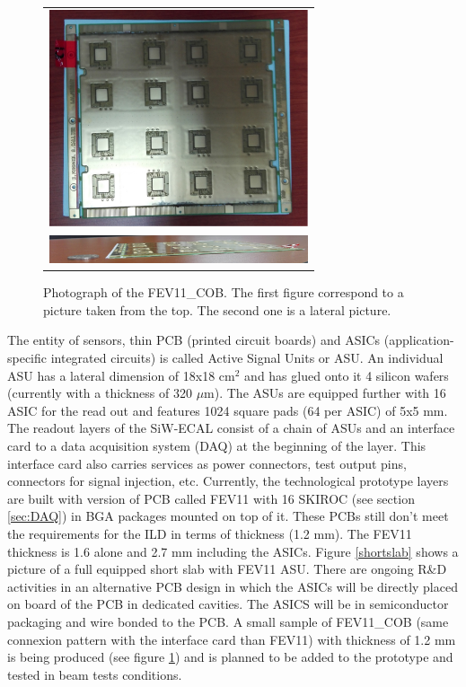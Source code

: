 \documentclass[journal]{IEEEtran}
\begin{document}
\begin{figure}[!t]
  \centering
  \begin{tabular}{l}
    \includegraphics[width=3.0in]{fevcob1-eps-converted-to.pdf}\\
    \includegraphics[width=3.0in]{fevcob2-eps-converted-to.pdf}
  \end{tabular}
\caption{Photograph of the FEV11\_COB. The first figure correspond to a picture taken from the top. The second one is a lateral picture.}
\label{fevcob}
\end{figure}

The entity
of sensors, thin PCB (printed circuit boards) and ASICs (application-specific integrated circuits) is called Active Signal Units or ASU.
An individual ASU has a lateral dimension of 18x18 cm$^{2}$ and has glued onto it 4 silicon wafers (currently with a thickness of 320 $\mu$m).
The ASUs are equipped
further with 16 ASIC for the read out and features 1024 square pads (64 per ASIC) of 5x5 mm.
The readout layers of the SiW-ECAL consist of a chain of ASUs and an interface card
to a data acquisition system (DAQ) at the beginning of the layer.
This interface card also carries services as power connectors,
test output pins, connectors for signal injection, etc. 
Currently, the technological prototype layers are built with version of PCB called FEV11 with 16 SKIROC (see section \ref{sec:DAQ})
 in BGA packages mounted on top of it.
These PCBs still don't meet the requirements
for the ILD in terms of thickness (1.2 mm). The FEV11 thickness is 1.6 alone and 2.7 mm including the ASICs.
Figure \ref{shortslab} shows a picture of a full equipped short slab with FEV11 ASU.
There are ongoing R\&D activities in an alternative PCB design in which the ASICs
will be directly placed on board of the PCB in dedicated cavities. The ASICS will be in semiconductor packaging and wire bonded to the PCB.
A small sample of FEV11\_COB (same connexion pattern with the interface card than FEV11)
with thickness of 1.2 mm is being produced (see figure \ref{fevcob})
and is planned to be added to the prototype and tested in beam tests conditions. 
\end{document}
